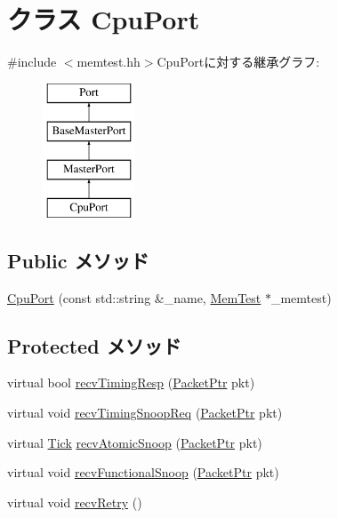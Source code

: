 \hypertarget{classMemTest_1_1CpuPort}{
\section{クラス CpuPort}
\label{classMemTest_1_1CpuPort}
}


{\ttfamily \#include $<$memtest.hh$>$}CpuPortに対する継承グラフ:\begin{figure}[H]
\begin{center}
\leavevmode
\includegraphics[height=4cm]{classMemTest_1_1CpuPort}
\end{center}
\end{figure}
\subsection*{Public メソッド}
\begin{DoxyCompactItemize}
\item 
\hyperlink{classMemTest_1_1CpuPort_a3ad8d6a0ec1ce0a3d0e90f2a43411b32}{CpuPort} (const std::string \&\_\-name, \hyperlink{classMemTest_1_1MemTest}{MemTest} $\ast$\_\-memtest)
\end{DoxyCompactItemize}
\subsection*{Protected メソッド}
\begin{DoxyCompactItemize}
\item 
virtual bool \hyperlink{classMemTest_1_1CpuPort_a482dba5588f4bee43e498875a61e5e0b}{recvTimingResp} (\hyperlink{classPacket}{PacketPtr} pkt)
\item 
virtual void \hyperlink{classMemTest_1_1CpuPort_ae43c73eff109f907118829fcfa9e7096}{recvTimingSnoopReq} (\hyperlink{classPacket}{PacketPtr} pkt)
\item 
virtual \hyperlink{base_2types_8hh_a5c8ed81b7d238c9083e1037ba6d61643}{Tick} \hyperlink{classMemTest_1_1CpuPort_ae1160d8f94f042aba1dc9a07a72e1e82}{recvAtomicSnoop} (\hyperlink{classPacket}{PacketPtr} pkt)
\item 
virtual void \hyperlink{classMemTest_1_1CpuPort_af5b15bc08781cf0ba6190efc37d5b67e}{recvFunctionalSnoop} (\hyperlink{classPacket}{PacketPtr} pkt)
\item 
virtual void \hyperlink{classMemTest_1_1CpuPort_a29cb5a4f98063ce6e9210eacbdb35298}{recvRetry} ()
\end{DoxyCompactItemize}
